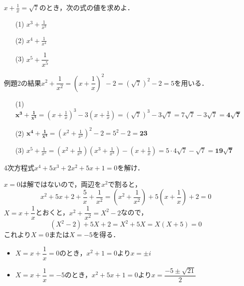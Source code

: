 \documentclass[a4paper,11pt]{ltjsarticle}
\begin{document}
\begin{toi}
$\displaystyle{x+\frac{1}{x}=\sqrt7}$のとき，次の式の値を求めよ．\\[5pt]
\begin{minipage}{0.33\linewidth}
\begin{itemize}
    \item [(1)]$\displaystyle{x^3+\frac{1}{x^3}}$
\end{itemize}
\end{minipage}
\begin{minipage}{0.33\linewidth}
\begin{itemize}
    \item [(2)]$\displaystyle{x^4+\frac{1}{x^4}}$
\end{itemize}
\end{minipage}
\begin{minipage}{0.33\linewidth}
\begin{itemize}
    \item [(3)]$x^5+\dfrac{1}{x^5}$
\end{itemize}
\end{minipage}
\end{toi}
\ans
例題2の結果$x^2+\dfrac{1}{x^2}=\left(x+\dfrac1x\right)^2-2=(\sqrt7)^2-2=5$を用いる．
\begin{itemize}
    \item [(1)] $\displaystyle\boldsymbol{x^3+\frac{1}{x^3}}=\left(x+\frac1x\right)^3-3\left(x+\frac1x\right)=(\sqrt7)^3-3\sqrt7=7\sqrt7-3\sqrt7=\boldsymbol{4\sqrt7}$
    \item [(2)] $\displaystyle\boldsymbol{x^4+\frac{1}{x^4}}=\left(x^2+\frac1{x^2}\right)^2-2=5^2-2=\boldsymbol{23}$
    \item [(3)] 
     $\displaystyle{{x^5+\frac{1}{x^5}}=\left(x^2+\frac{1}{x^2}\right)\left(x^3+\frac{1}{x^3}\right)-\left(x+\frac{1}{x}\right) =5\cdot4\sqrt7-\sqrt7=\boldsymbol{19\sqrt7}}$
\end{itemize}
\newpage
\begin{toi}
    4次方程式$x^4+5x^3+2x^2+5x+1=0$を解け．
\end{toi}
\ans 
$x=0$は解ではないので，両辺を$x^2$で割ると，
\[x^2+5x+2+\frac5x+\frac{1}{x^2}=\left(x^2+\frac{1}{x^2}\right)+5\left(x+\frac1x\right)+2=0\]
$X=x+\dfrac1x$とおくと，$x^2+\dfrac{1}{x^2}=X^2-2$なので，
\[(X^2-2)+5X+2=X^2+5X=X(X+5)=0\]
これより$X=0$または$X=-5$を得る．
\begin{itemize}
    \item $X=x+\dfrac1x=0$のとき，$x^2+1=0$より$x=\pm i$
    \item $X=x+\dfrac1x=-5$のとき，$x^2+5x+1=0$より$x=\dfrac{-5\pm\sqrt{21}}{2}$
\end{itemize}
\end{document}
